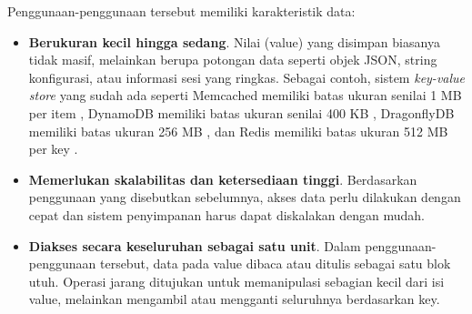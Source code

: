 Penggunaan-penggunaan tersebut memiliki karakteristik data:
\begin{itemize}
  \item \textbf{Berukuran kecil hingga sedang}. Nilai (value) yang disimpan biasanya tidak masif, melainkan berupa potongan data seperti objek JSON, string konfigurasi, atau informasi sesi yang ringkas. Sebagai contoh, sistem \textit{key-value store} yang sudah ada seperti Memcached memiliki batas ukuran senilai 1 MB per item \parencite{memcached_docs}, DynamoDB memiliki batas ukuran senilai 400 KB \parencite{dynamodb_docs}, DragonflyDB memiliki batas ukuran 256 MB \parencite{dragonflydb_docs}, dan Redis memiliki batas ukuran 512 MB per key \parencite{redis_docs}.
  \item \textbf{Memerlukan skalabilitas dan ketersediaan tinggi}. Berdasarkan penggunaan yang disebutkan sebelumnya, akses data perlu dilakukan dengan cepat dan sistem penyimpanan harus dapat diskalakan dengan mudah.
  \item \textbf{Diakses secara keseluruhan sebagai satu unit}. Dalam penggunaan-penggunaan tersebut, data pada value dibaca atau ditulis sebagai satu blok utuh. Operasi jarang ditujukan untuk memanipulasi sebagian kecil dari isi value, melainkan mengambil atau mengganti seluruhnya berdasarkan key.
\end{itemize}

